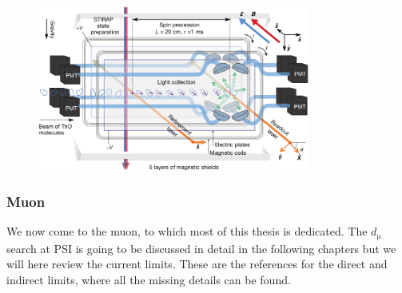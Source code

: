 \begin{refsection}
            \begin{figure}
                \centering
                \includegraphics[width = 0.8\textwidth]{Figures/Introduction/eEDM_ACME.png}
                \caption{}
                \label{fig:ACME}
            \end{figure}
        
        \subsubsection{Muon}
            We now come to the muon, to which most of this thesis is dedicated. The $d_\upmu$ search at PSI is going to be discussed in detail in the following chapters but we will here review the current limits. 
            These are the references for the direct \cite{muEDM:direct} and indirect \cite{muEDM:indirect} limits, where all the missing details can be found.
            

\end{refsection}
